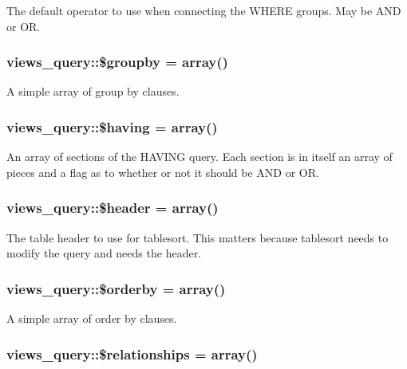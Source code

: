 The default operator to use when connecting the WHERE groups. May be AND or OR. \hypertarget{classviews__query_9e680695793121eceb7da5e5f8f0105a}{
\subsubsection[{\$groupby}]{\setlength{\rightskip}{0pt plus 5cm}views\_\-query::\$groupby = array()}}
\label{classviews__query_9e680695793121eceb7da5e5f8f0105a}


A simple array of group by clauses. \hypertarget{classviews__query_a63f09e8b8810660bbc0c480f763c8a7}{
\subsubsection[{\$having}]{\setlength{\rightskip}{0pt plus 5cm}views\_\-query::\$having = array()}}
\label{classviews__query_a63f09e8b8810660bbc0c480f763c8a7}


An array of sections of the HAVING query. Each section is in itself an array of pieces and a flag as to whether or not it should be AND or OR. \hypertarget{classviews__query_8c8dc5000b07e8a5ade3691ddabecbc3}{
\subsubsection[{\$header}]{\setlength{\rightskip}{0pt plus 5cm}views\_\-query::\$header = array()}}
\label{classviews__query_8c8dc5000b07e8a5ade3691ddabecbc3}


The table header to use for tablesort. This matters because tablesort needs to modify the query and needs the header. \hypertarget{classviews__query_03a5999bf0fcd2bd5a51dfea6c78ebdb}{
\subsubsection[{\$orderby}]{\setlength{\rightskip}{0pt plus 5cm}views\_\-query::\$orderby = array()}}
\label{classviews__query_03a5999bf0fcd2bd5a51dfea6c78ebdb}


A simple array of order by clauses. \hypertarget{classviews__query_deed5f6f13a7d105ada7c1329c3169d6}{
\subsubsection[{\$relationships}]{\setlength{\rightskip}{0pt plus 5cm}views\_\-query::\$relationships = array()}}
\label{classviews__query_deed5f6f13a7d105ada7c1329c3169d6}


